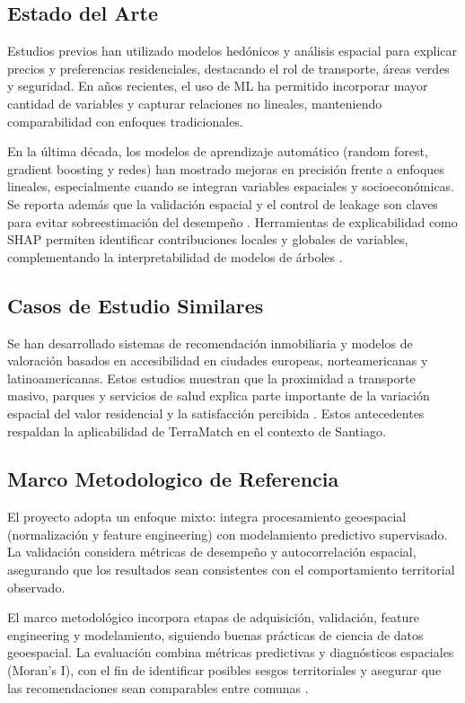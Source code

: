 \documentclass[11pt,letterpaper]{article}
\begin{document}
\subsection{Estado del Arte}
Estudios previos han utilizado modelos hedónicos y análisis espacial para explicar precios y preferencias residenciales, destacando el rol de transporte, áreas verdes y seguridad. En años recientes, el uso de ML ha permitido incorporar mayor cantidad de variables y capturar relaciones no lineales, manteniendo comparabilidad con enfoques tradicionales.

En la última década, los modelos de aprendizaje automático (random forest, gradient boosting y redes) han mostrado mejoras en precisión frente a enfoques lineales, especialmente cuando se integran variables espaciales y socioeconómicas. Se reporta además que la validación espacial y el control de leakage son claves para evitar sobreestimación del desempeño \cite{fotheringham2002,hoon2020,li2020}. Herramientas de explicabilidad como SHAP permiten identificar contribuciones locales y globales de variables, complementando la interpretabilidad de modelos de árboles \cite{lundberg2017}.

\subsection{Casos de Estudio Similares}
Se han desarrollado sistemas de recomendación inmobiliaria y modelos de valoración basados en accesibilidad en ciudades europeas, norteamericanas y latinoamericanas. Estos estudios muestran que la proximidad a transporte masivo, parques y servicios de salud explica parte importante de la variación espacial del valor residencial y la satisfacción percibida \cite{li2017,zhang2019,alvarez2021}. Estos antecedentes respaldan la aplicabilidad de TerraMatch en el contexto de Santiago.

\subsection{Marco Metodologico de Referencia}
El proyecto adopta un enfoque mixto: integra procesamiento geoespacial (normalización y feature engineering) con modelamiento predictivo supervisado. La validación considera métricas de desempeño y autocorrelación espacial, asegurando que los resultados sean consistentes con el comportamiento territorial observado.

El marco metodológico incorpora etapas de adquisición, validación, feature engineering y modelamiento, siguiendo buenas prácticas de ciencia de datos geoespacial. La evaluación combina métricas predictivas y diagnósticos espaciales (Moran's I), con el fin de identificar posibles sesgos territoriales y asegurar que las recomendaciones sean comparables entre comunas \cite{anselin1995,osullivan2010}.
\end{document}
